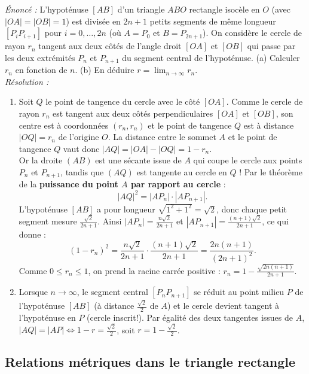 \begin{exemple}
\emph{Énoncé :} L'hypoténuse $[AB]$ d'un triangle $ABO$ rectangle isocèle en $O$ (avec $|OA| = |OB| = 1$) est divisée en $2n+1$ petits segments de même longueur $[P_i P_{i+1}]$ pour $i = 0, \dots, 2n$ (où $A = P_0$ et $B = P_{2n+1}$). On considère le cercle de rayon $r_n$ tangent aux deux côtés de l'angle droit $[OA]$ et $[OB]$ qui passe par les deux extrémités $P_n$ et $P_{n+1}$ du segment central de l'hypoténuse. (a) Calculer $r_n$ en fonction de $n$. (b) En déduire $r = \lim_{n\to\infty} r_n$.\\
\emph{Résolution :}
\begin{enumerate}[label=(\alph*)]
    \item Soit $Q$ le point de tangence du cercle avec le côté $[OA]$. Comme le cercle de rayon $r_n$ est tangent aux deux côtés perpendiculaires $[OA]$ et $[OB]$, son centre est à coordonnées $(r_n, r_n)$ et le point de tangence $Q$ est à distance $|OQ| = r_n$ de l'origine $O$. La distance entre le sommet $A$ et le point de tangence $Q$ vaut donc $|AQ| = |OA| - |OQ| = 1 - r_n$.\\
    Or la droite $(AB)$ est une sécante issue de $A$ qui coupe le cercle aux points $P_n$ et $P_{n+1}$, tandis que $(AQ)$ est tangente au cercle en $Q$ ! Par le théorème de la \textbf{puissance du point $A$ par rapport au cercle} :
    \[
        |AQ|^2 = |AP_n| \cdot |AP_{n+1}|.
    \]
    L'hypoténuse $[AB]$ a pour longueur $\sqrt{1^2+1^2} = \sqrt{2}$, donc chaque petit segment mesure $\frac{\sqrt{2}}{2n+1}$. Ainsi $|AP_n| = \frac{n\sqrt{2}}{2n+1}$ et $|AP_{n+1}| = \frac{(n+1)\sqrt{2}}{2n+1}$, ce qui donne :
    \[
        (1 - r_n)^2 = \frac{n\sqrt{2}}{2n+1} \cdot \frac{(n+1)\sqrt{2}}{2n+1} = \frac{2n(n+1)}{(2n+1)^2}.
    \]
    Comme $0 \le r_n \le 1$, on prend la racine carrée positive : $r_n = \boxed{1 - \frac{\sqrt{2n(n+1)}}{2n+1}}$.
    \item Lorsque $n \to \infty$, le segment central $[P_n P_{n+1}]$ se réduit au point milieu $P$ de l'hypoténuse $[AB]$ (à distance $\frac{\sqrt{2}}{2}$ de $A$) et le cercle devient tangent à l'hypoténuse en $P$ (cercle inscrit!). Par égalité des deux tangentes issues de $A$, $|AQ| = |AP| \iff 1 - r = \frac{\sqrt{2}}{2}$, soit $r = \boxed{1 - \frac{\sqrt{2}}{2}}$.
\end{enumerate}
\end{exemple}

\subsection{Relations métriques dans le triangle rectangle}

